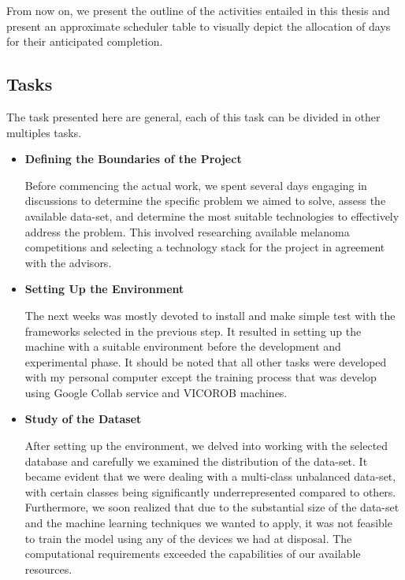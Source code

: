 From now on, we present the outline of the activities entailed in this thesis
and present an approximate scheduler table to visually depict the allocation of
days for their anticipated completion.

\subsection{Tasks}

The task presented here are general, each of this task can be divided in other
multiples tasks.

\begin{itemize}
  \item{\textbf{Defining the Boundaries of the Project}}

    Before commencing the actual work, we spent several days engaging in
    discussions to determine the specific problem we aimed to solve, assess the
    available data-set, and determine the most suitable technologies to
    effectively address the problem. This involved researching available
    melanoma competitions and selecting a technology stack for the project in
    agreement with the advisors.

  \item{\textbf{Setting Up the Environment}}

    The next weeks was mostly devoted to install and make simple test with the
    frameworks selected in the previous step. It resulted in setting up the
    machine with a suitable environment before the development and experimental
    phase. It should be noted that all other tasks were developed with my
    personal computer except the training process that was develop using Google
    Collab service and VICOROB machines.

  \item{\textbf{Study of the Dataset}}

    After setting up the environment, we delved into working with the selected
    database and carefully we examined the distribution of the data-set. It
    became evident that we were dealing with a multi-class unbalanced data-set,
    with certain classes being significantly underrepresented compared to
    others. \\

    Furthermore, we soon realized that due to the substantial size of the
    data-set and the machine learning techniques we wanted to apply, it was not
    feasible to train the model using any of the devices we had at disposal.
    The computational requirements exceeded the capabilities of our available
    resources.


\end{itemize}
